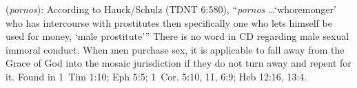 \item[Male-sex-buyer,]

(\textit{pornos}):
According to Hauck/Schulz (TDNT 6:580), ``\emph{pornos} \ldots `whoremonger' who has intercourse with prostitutes then specifically one who lets himself be used for money, `male prostitute''' There is no word in CD regarding male sexual immoral conduct. When men purchase sex, it is applicable to fall away from the Grace of God into the mosaic jurisdiction if they do not turn away and repent for it.
Found in 1~Tim 1:10; Eph 5:5; 1~Cor. 5:10, 11, 6:9; Heb 12:16, 13:4.
